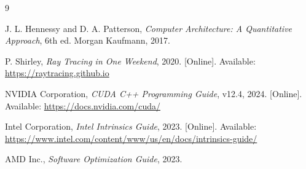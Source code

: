 \documentclass[conference]{IEEEtran}
\begin{document}
\begin{thebibliography}{9}

J. L. Hennessy and D. A. Patterson,
\textit{Computer Architecture: A Quantitative Approach}, 6th ed.
Morgan Kaufmann, 2017.

P. Shirley, \textit{Ray Tracing in One Weekend}, 2020. [Online].
Available: \url{https://raytracing.github.io}

NVIDIA Corporation, \textit{CUDA C++ Programming Guide}, v12.4, 2024.
[Online]. Available: \url{https://docs.nvidia.com/cuda/}

Intel Corporation, \textit{Intel Intrinsics Guide}, 2023.
[Online]. Available: \url{https://www.intel.com/content/www/us/en/docs/intrinsics-guide/}

AMD Inc., \textit{Software Optimization Guide},
2023.

\end{thebibliography}
\end{document}
